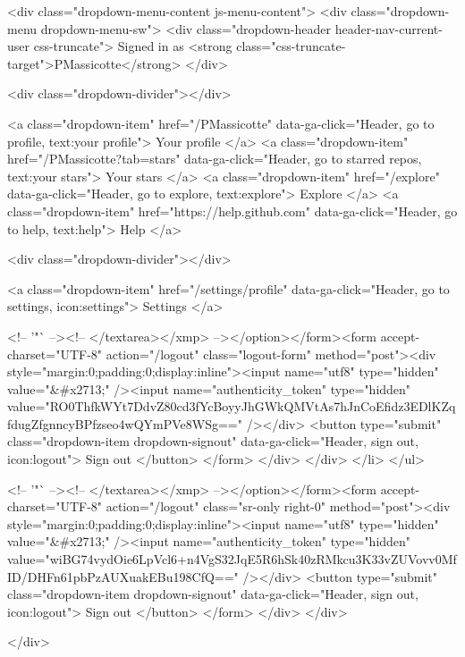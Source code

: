     <div class="dropdown-menu-content js-menu-content">
      <div class="dropdown-menu dropdown-menu-sw">
        <div class="dropdown-header header-nav-current-user css-truncate">
          Signed in as <strong class="css-truncate-target">PMassicotte</strong>
        </div>

        <div class="dropdown-divider"></div>

        <a class="dropdown-item" href="/PMassicotte" data-ga-click="Header, go to profile, text:your profile">
          Your profile
        </a>
        <a class="dropdown-item" href="/PMassicotte?tab=stars" data-ga-click="Header, go to starred repos, text:your stars">
          Your stars
        </a>
        <a class="dropdown-item" href="/explore" data-ga-click="Header, go to explore, text:explore">
          Explore
        </a>
        <a class="dropdown-item" href="https://help.github.com" data-ga-click="Header, go to help, text:help">
          Help
        </a>

        <div class="dropdown-divider"></div>

        <a class="dropdown-item" href="/settings/profile" data-ga-click="Header, go to settings, icon:settings">
          Settings
        </a>

        <!-- '"` --><!-- </textarea></xmp> --></option></form><form accept-charset="UTF-8" action="/logout" class="logout-form" method="post"><div style="margin:0;padding:0;display:inline"><input name="utf8" type="hidden" value="&#x2713;" /><input name="authenticity_token" type="hidden" value="RO0ThfkWYt7DdvZ80cd3fYcBoyyJhGWkQMVtAs7hJnCoEfidz3EDlKZqfdugZfgnncyBPfzseo4wQYmPVe8WSg==" /></div>
          <button type="submit" class="dropdown-item dropdown-signout" data-ga-click="Header, sign out, icon:logout">
            Sign out
          </button>
</form>      </div>
    </div>
  </li>
</ul>


    <!-- '"` --><!-- </textarea></xmp> --></option></form><form accept-charset="UTF-8" action="/logout" class="sr-only right-0" method="post"><div style="margin:0;padding:0;display:inline"><input name="utf8" type="hidden" value="&#x2713;" /><input name="authenticity_token" type="hidden" value="wiBG74vydOie6LpVcl6+n4VgS32JqE5R6hSk40zRMkcu3K33vZUVovv0MfID/DHFn61pbPzAUXuakEBu198CfQ==" /></div>
      <button type="submit" class="dropdown-item dropdown-signout" data-ga-click="Header, sign out, icon:logout">
        Sign out
      </button>
</form>  </div>
</div>


      

  </div>

